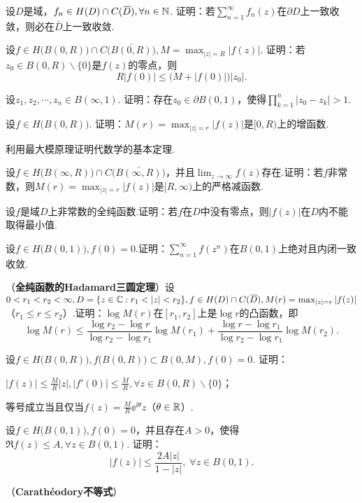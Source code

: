 \begin{xiti}
  \item 设$D$是域，$f_n\in H(D)\cap C({}\mkern2mu\overline{\mkern-2muD}),\forall n\in \mathbb N$. 证明：若$\sum_{n=1}^\infty f_n(z)$在$\partial D$上一致收敛，则必在$\bar D$上一致收敛.
  \item 设$f\in H\big(B(0,R)\big)\cap C\big(\bar{B(0,R)}\big),M=\max_{|z|=R}|f(z)|$. 证明：若$z_0\in B(0,R)\backslash\{0\}$是$f(z)$的零点，则
    \[R|f(0)|\le\big(M+|f(0)|\big)|z_0|.\]
  \item 设$z_1,z_2,\cdots,z_n\in B(\infty,1)$. 证明：存在$z_0\in \partial B(0,1)$，使得$\prod_{k=1}^n|z_0-z_k|>1$.
  \item 设$f\in H\big(B(0,R)\big)$. 证明：$M(r)=\max_{|z|=r}|f(z)|$是$[0,R)$上的增函数.
  \item 利用最大模原理证明代数学的基本定理.
  \item 设$f\in H\big(B(\infty,R)\big)\cap C\big(\bar{B(\infty,R)}\big)$，并且$\lim_{z\to\infty}f(z)$存在.证明：若$f$非常数，则$M(r)=\max_{|z|=r}|f(z)|$是$[R,\infty)$上的严格减函数.
  \item 设$f$是域$D$上非常数的全纯函数.证明：若$f$在$D$中没有零点，则$|f(z)|$在$D$内不能取得最小值.
  \item 设$f\in H\big(B(0,1)\big),f(0)=0$.证明：$\sum_{n=1}^\infty f(z^n)$在$B(0,1)$上绝对且内闭一致收敛.
  \item （\textbf{全纯函数的Hadamard三圆定理}）设$0<r_1<r_2<\infty,D=\{z\in \MC:r_1<|z|<r_2\},f\in H(D)\cap C(\bar D),M(r)=
    \max_{|z|=r}|f(z)|$（$r_1\le r\le r_2$）.证明：$\log M(r)$在$[r_1,r_2]$上是$\log r$的凸函数，即
    \[\log M(r)\le\frac{\log r_2-\log r}{\log r_2-\log r_1}\log M(r_1)
    +\frac{\log r-\log r_1}{\log r_2-\log r_1}\log M(r_2).\]
  \item 设$f\in H\big(B(0,R)\big),f\big(B(0,R)\big)\subset B(0,M),f(0)=0$. 证明：
    \begin{enuma}
      \item $|f(z)|\le\frac MR|z|,|f'(0)|\le \frac MR,\forall z\in B(0,R)\backslash\{0\}$；
      \item 等号成立当且仅当$f(z)=\frac MR\ee^{\ii\theta}z$（$\theta\in\mathbb R$）.
    \end{enuma}
  \item 设$f\in H\big(B(0,1)\big),f(0)=0$，并且存在$A>0$，使得$\Re f(z)\le A,\forall z\in B(0,1)$. 证明：
      \[
        |f(z)| \le \frac{2A|z|}{1-|z|}, \; \forall z\in B(0,1).
      \]
  \item （\textbf{Carath\'eodory不等式}）

\end{xiti}
